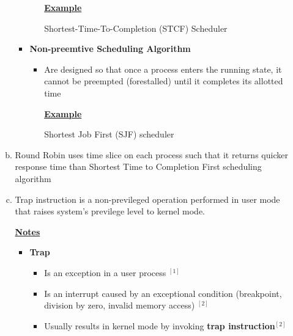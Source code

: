 \documentclass[12pt]{article}
\begin{document}
\begin{enumerate}[1.]
\begin{enumerate}[a)]
\begin{itemize}
\begin{itemize}
                \bigskip

                \underline{\textbf{Example}}

                \bigskip

                Shortest-Time-To-Completion (STCF) Scheduler

                \bigskip
            \end{itemize}
            \item \textbf{Non-preemtive Scheduling Algorithm}

            \begin{itemize}
                \item Are designed so that once a process enters the running state,
                it cannot be preempted (forestalled) until it completes its allotted time

                \bigskip

                \underline{\textbf{Example}}

                \bigskip

                Shortest Job First (SJF) scheduler
            \end{itemize}
        \end{itemize}

        \item

        Round Robin uses time slice on each process such that it returns
        quicker response time than Shortest Time to Completion First scheduling algorithm

        \item

        Trap instruction is a non-previleged operation performed in user mode that
        raises system's previlege level to kernel mode.

        \bigskip

        \underline{\textbf{Notes}}

        \begin{itemize}
            \item \textbf{Trap}
            \begin{itemize}
                \item Is an exception in a user process $^{[1]}$
                \item Is an interrupt caused by an exceptional condition (breakpoint, division by zero, invalid memory access) $^{[2]}$
                \item Usually results in kernel mode by invoking \textbf{trap instruction}$^{[2]}$
            \end{itemize}


\end{itemize}
\end{enumerate}
\end{enumerate}
\end{document}
